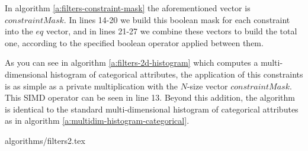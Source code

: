 In algorithm \ref{a:filters-constraint-mask} the aforementioned vector is $constraintMask$.
In lines 14-20 we build this boolean mask for each constraint into the $eq$ vector, and in lines 21-27 we combine these vectors to build the total one, according to the specified boolean operator applied between them.

As you can see in algorithm \ref{a:filters-2d-histogram} which computes a multi\hyp dimensional histogram of categorical attributes, the application of this constraints is as simple as a private multiplication with the $N$-size vector $constraintMask$.
This SIMD operator can be seen in line 13.
Beyond this addition, the algorithm is identical to the standard multi\hyp dimensional histogram of categorical attributes as in algorithm \ref{a:multidim-histogram-categorical}.

{algorithms/filters2.tex}




